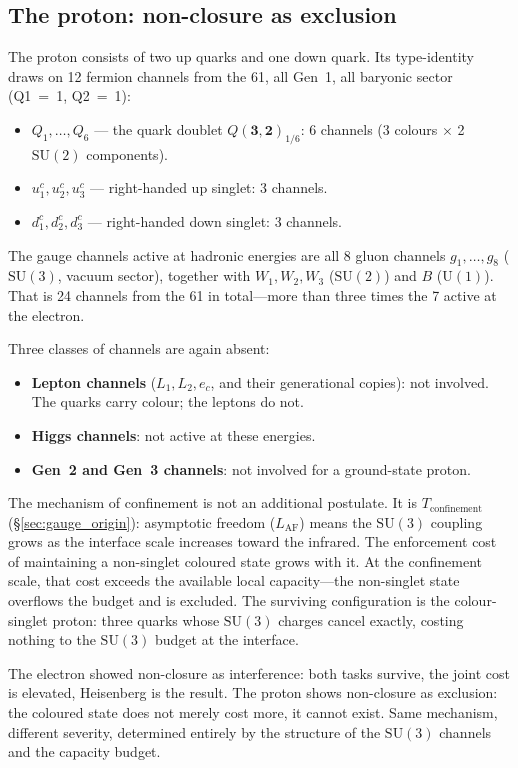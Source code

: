\documentclass[11pt]{article}
\newenvironment{varlist}{\begin{itemize}[nosep,leftmargin=2em]}{\end{itemize}}
\newcommand{\SU}{\mathrm{SU}}
\newcommand{\U}{\mathrm{U}}
\begin{document}
\subsection*{The proton: non-closure as exclusion}

The proton consists of two up quarks and one down quark.  Its
type-identity draws on 12 fermion channels from the 61, all Gen~1, all
baryonic sector (Q1~=~1, Q2~=~1):

\begin{varlist}
\item $Q_1,\ldots,Q_6$ --- the quark doublet $Q(\mathbf{3},\mathbf{2})_{1/6}$: 6 channels
(3 colours $\times$ 2 $\SU(2)$ components).
\item $u^c_1, u^c_2, u^c_3$ --- right-handed up singlet: 3 channels.
\item $d^c_1, d^c_2, d^c_3$ --- right-handed down singlet: 3 channels.
\end{varlist}

The gauge channels active at hadronic energies are all 8 gluon channels
$g_1,\ldots,g_8$ ($\SU(3)$, vacuum sector), together with $W_1, W_2,
W_3$ ($\SU(2)$) and $B$ ($\U(1)$).  That is 24 channels from the 61 in
total---more than three times the 7 active at the electron.

Three classes of channels are again absent:
\begin{varlist}
\item \textbf{Lepton channels} ($L_1, L_2, e_c$, and their generational
copies): not involved.  The quarks carry colour; the leptons do not.
\item \textbf{Higgs channels}: not active at these energies.
\item \textbf{Gen~2 and Gen~3 channels}: not involved for a
ground-state proton.
\end{varlist}

The mechanism of confinement is not an additional postulate.  It is
$T_{\mathrm{confinement}}$ (\S\ref{sec:gauge_origin}): asymptotic freedom
($L_{\mathrm{AF}}$) means the $\SU(3)$ coupling grows as the interface
scale increases toward the infrared.  The enforcement cost of maintaining
a non-singlet coloured state grows with it.  At the confinement scale, that
cost exceeds the available local capacity---the non-singlet state overflows
the budget and is excluded.  The surviving configuration is the
colour-singlet proton: three quarks whose $\SU(3)$ charges cancel exactly,
costing nothing to the $\SU(3)$ budget at the interface.

The electron showed non-closure as interference: both tasks survive, the
joint cost is elevated, Heisenberg is the result.  The proton shows
non-closure as exclusion: the coloured state does not merely cost more, it
cannot exist.  Same mechanism, different severity, determined entirely by
the structure of the $\SU(3)$ channels and the capacity budget.
\end{document}
